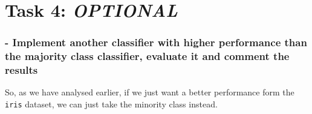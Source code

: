 \documentclass[11pt]{article}
\begin{document}
    \section{\texorpdfstring{Task 4:
\textbf{\emph{OPTIONAL}}}{Task 4: OPTIONAL}}\label{task-4-optional}

\subsubsection{- Implement another classifier with higher performance
than the majority class classifier, evaluate it and comment the
results}\label{implement-another-classifier-with-higher-performance-than-the-majority-class-classifier-evaluate-it-and-comment-the-results}

    So, as we have analysed earlier, if we just want a better performance
form the \texttt{iris} dataset, we can just take the minority class
instead.
\end{document}
